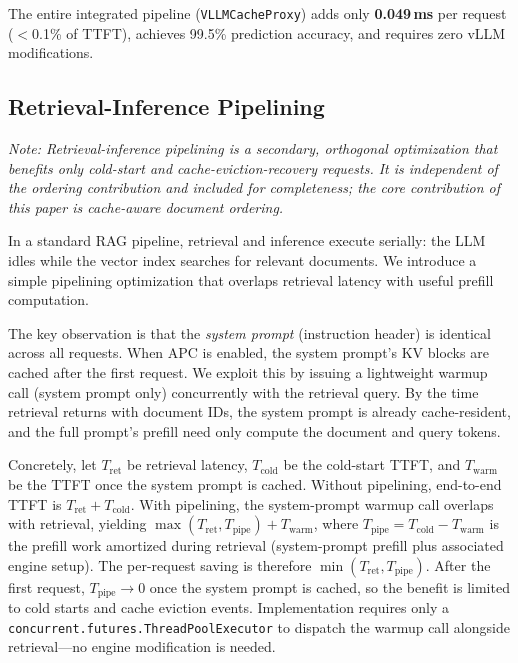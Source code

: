 \documentclass{article}
\begin{document}
The entire integrated pipeline (\texttt{VLLMCacheProxy}) adds only \textbf{0.049\,ms} per request ($<$0.1\% of TTFT), achieves 99.5\% prediction accuracy, and requires zero vLLM modifications.

\subsection{Retrieval-Inference Pipelining}

\noindent\textit{Note: Retrieval-inference pipelining is a secondary, orthogonal optimization that benefits only cold-start and cache-eviction-recovery requests. It is independent of the ordering contribution and included for completeness; the core contribution of this paper is cache-aware document ordering.}

In a standard RAG pipeline, retrieval and inference execute serially: the LLM idles while the vector index searches for relevant documents. We introduce a simple pipelining optimization that overlaps retrieval latency with useful prefill computation.

The key observation is that the \emph{system prompt} (instruction header) is identical across all requests. When APC is enabled, the system prompt's KV blocks are cached after the first request. We exploit this by issuing a lightweight warmup call (system prompt only) concurrently with the retrieval query. By the time retrieval returns with document IDs, the system prompt is already cache-resident, and the full prompt's prefill need only compute the document and query tokens.

Concretely, let $T_{\text{ret}}$ be retrieval latency, $T_{\text{cold}}$ be the cold-start TTFT, and $T_{\text{warm}}$ be the TTFT once the system prompt is cached. Without pipelining, end-to-end TTFT is $T_{\text{ret}} + T_{\text{cold}}$. With pipelining, the system-prompt warmup call overlaps with retrieval, yielding $\max(T_{\text{ret}}, T_{\text{pipe}}) + T_{\text{warm}}$, where $T_{\text{pipe}} = T_{\text{cold}} - T_{\text{warm}}$ is the prefill work amortized during retrieval (system-prompt prefill plus associated engine setup). The per-request saving is therefore $\min(T_{\text{ret}}, T_{\text{pipe}})$. After the first request, $T_{\text{pipe}} \rightarrow 0$ once the system prompt is cached, so the benefit is limited to cold starts and cache eviction events. Implementation requires only a \texttt{concurrent.futures.ThreadPoolExecutor} to dispatch the warmup call alongside retrieval---no engine modification is needed.
\end{document}
